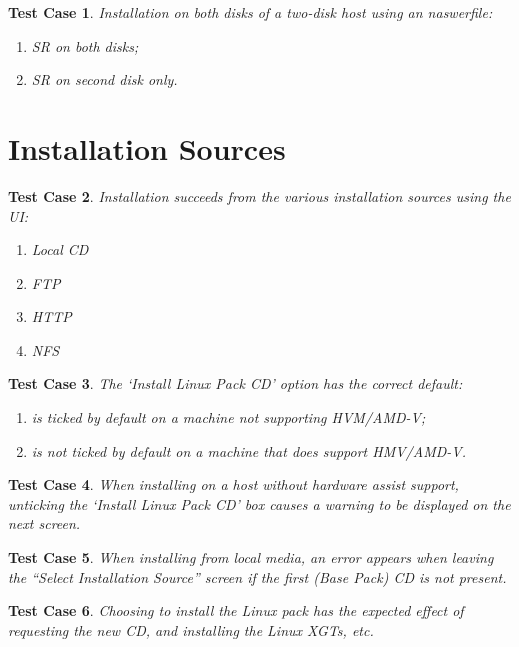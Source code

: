 \documentclass[a4paper]{article}
\newtheorem{testcase}{Test Case}
\begin{document}
\begin{testcase}
Installation on both disks of a two-disk host using an naswerfile:
\begin{enumerate}
\item SR on both disks;
\item SR on second disk only.
\end{enumerate}
\end{testcase}

\section{Installation Sources}

\begin{testcase}
Installation succeeds from the various installation sources using the
UI:
\begin{enumerate}
\item Local CD
\item FTP
\item HTTP
\item NFS
\end{enumerate}
\end{testcase}

\begin{testcase}
The `Install Linux Pack CD' option has the correct default:
\begin{enumerate}
\item is ticked by default on a machine not supporting HVM/AMD-V;
\item is not ticked by default on a machine that does support HMV/AMD-V.
\end{enumerate}
\end{testcase}

\begin{testcase}
When installing on a host without hardware assist support, unticking
the `Install Linux Pack CD' box causes a warning to be displayed on
the next screen.
\end{testcase}

\begin{testcase}
When installing from local media, an error appears when leaving the
``Select Installation Source'' screen if the first (Base Pack) CD is
not present.
\end{testcase}

\begin{testcase}
Choosing to install the Linux pack has the expected effect of
requesting the new CD, and installing the Linux XGTs, etc.
\end{testcase}
\end{document}
